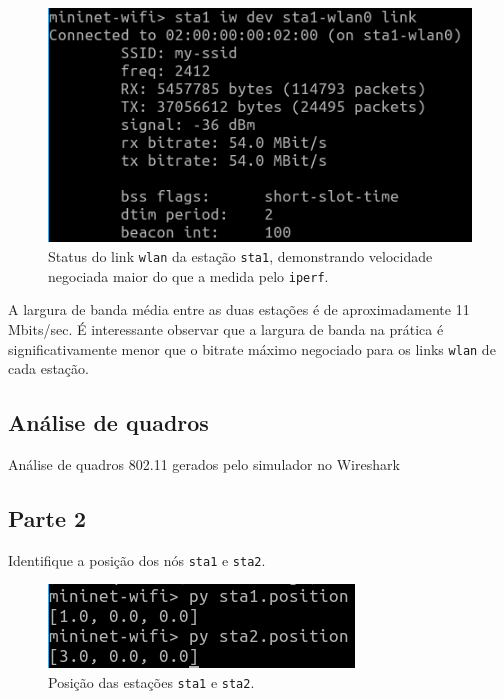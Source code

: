 \documentclass{article}
\begin{document}
\begin{figure}[!htb]
\centering
\includegraphics[width=\columnwidth]{images/p1_iwconfig.png}
\caption{Status do link \texttt{wlan} da estação \texttt{sta1}, demonstrando velocidade negociada maior do que a medida pelo \texttt{iperf}.}
\end{figure}

A largura de banda média entre as duas estações é de aproximadamente 11 Mbits/sec.
É interessante observar que a largura de banda na prática é significativamente menor que o
bitrate máximo negociado para os links \texttt{wlan} de cada estação.


\FloatBarrier

\subsection{Análise de quadros}
Análise de quadros 802.11 gerados pelo simulador no Wireshark

\subsection*{Parte 2}

\begin{tcolorbox}
    Identifique a posição dos nós \texttt{sta1} e \texttt{sta2}.
\end{tcolorbox}

\begin{figure}[!htb]
\centering
\includegraphics[width=\columnwidth]{images/p2_position.png}
\caption{Posição das estações \texttt{sta1} e \texttt{sta2}.}
\end{figure}
\end{document}
